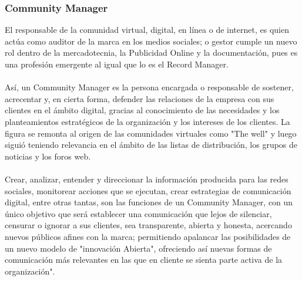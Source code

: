 \subsubsection{Community Manager}
%
El responsable de la comunidad virtual, digital, en l\'inea o de internet, es quien act\'ua como auditor de la marca en los medios sociales; o gestor cumple un nuevo rol dentro de la mercadotecnia, la Publicidad Online y la documentaci\'on, pues es una profesi\'on emergente al igual que lo es el Record Manager.%
\\%
\\%
As\'i, un Community Manager es la persona encargada o responsable de sostener, acrecentar y, en cierta forma, defender las relaciones de la empresa con sus clientes en el \'ambito digital, gracias al conocimiento de las necesidades y los planteamientos estrat\'egicos de la organizaci\'on y los intereses de los clientes. La figura se remonta al origen de las comunidades virtuales como "The well" y luego sigui\'o teniendo relevancia en el \'ambito de las listas de distribuci\'on, los grupos de noticias y los foros web.%
\\%
\\%
Crear, analizar, entender y direccionar la informaci\'on producida para las redes sociales, monitorear acciones que se ejecutan, crear estrategias de comunicaci\'on digital, entre otras tantas, son las funciones de un Community Manager, con un \'unico objetivo que ser\'a establecer una comunicaci\'on que lejos de silenciar, censurar o ignorar a sus clientes, sea transparente, abierta y honesta, acercando nuevos p\'ublicos afines con la marca; permitiendo apalancar las posibilidades de un nuevo modelo de "innovaci\'on Abierta", ofreciendo as\'i nuevas formas de comunicaci\'on m\'as relevantes en las que en cliente se sienta parte activa de la organizaci\'on".%
%
